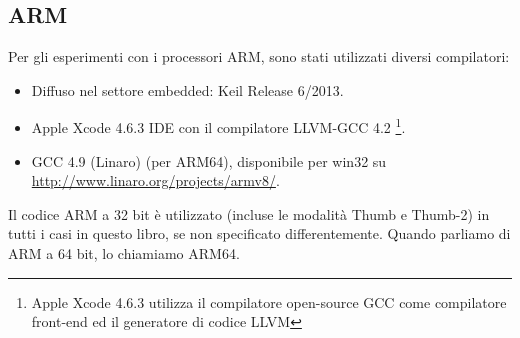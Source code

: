 \subsection{ARM}
\label{sec:hw_ARM}

\myindex{\idevices}
Per gli esperimenti con i processori ARM, sono stati utilizzati diversi compilatori:

\begin{itemize}
\item Diffuso nel settore embedded: Keil Release 6/2013.

\item Apple Xcode 4.6.3 IDE con il compilatore LLVM-GCC 4.2
\footnote{Apple Xcode 4.6.3 utilizza il compilatore open-source GCC come compilatore front-end ed il generatore di codice LLVM}.

\item GCC 4.9 (Linaro) (per ARM64), disponibile per win32 su \url{http://www.linaro.org/projects/armv8/}.

\end{itemize}

Il codice ARM a 32 bit è utilizzato (incluse le modalità Thumb e Thumb-2) in tutti i casi in questo libro, se non specificato differentemente.
Quando parliamo di ARM a 64 bit, lo chiamiamo ARM64.






